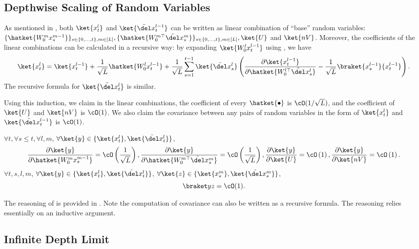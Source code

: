 \subsection{Depthwise Scaling of Random Variables}

As mentioned in , both $\ket{x_t^l}$ and $\ket{\tilde\del x_t^{l-1}}$ can be written as linear combination of ``base'' random variables: $\{\hatket{W_0^m x_s^{m-1}}\}_{s\in \{0,\ldots, t\}, m\in [L]},\{\hatket{W_0^{m\top} \tilde\del x_s^{m}}\}_{s\in \{0,\ldots, t\}, m\in [L]}, \ket{U}$ and $\ket{nV}$. Moreover, the coefficients of the linear combinations can be calculated in a recursive way: 
by expanding $\ket{W_0^l x_t^{l-1}}$ using , we have 
\[\ket{x_t^l} = \ket{x_t^{l-1}} + \frac1{\sqrt L} \hatket{W_0^l x_t^{l-1}} + \frac1{\sqrt L} \sum_{s=1}^{t-1} \ket{\tilde\del x_s^{l}} \left(\frac{\partial \ket{x_t^{l-1}}}{\partial \hatket{W_0^{l\top} \tilde\del x_s^{l}}} - \frac1{\sqrt L} \braket{x_s^{l-1}}{x_t^{l-1}} \right).\]
The recursive formula for $\ket{\tilde\del x_t^l}$ is similar. 

Using this induction, we claim in the linear combinations, the coefficient of every $\hatket{\bullet}$ is $\cO(1/\sqrt{L})$, and the coefficient of $\ket{U}$ and $\ket{nV}$ is $\cO(1)$. We also claim the covariance between any pairs of random variables in the form of $\ket{x_t^l}$ and $\ket{\tilde\del x_t^{l-1}}$ is $\cO(1)$. 
\begin{prop}\label{prop:derivatives}
     $\forall t, \forall s \leq t, \forall l,m$, $\forall \ket{y}\in \{\ket{x_t^l}, \ket{\tilde\del x_t^l}\}$, 
     \[\frac{\partial \ket{y}}{\partial \hatket{W_0^mx_s^{m-1}}} = \cO\left(\frac1{\sqrt L}\right),
     \frac{\partial \ket{y}}{\partial \hatket{W_0^{m\top}\tilde\del x_s^m}} = \cO\left(\frac1{\sqrt L}\right),
     \frac{\partial \ket{y}}{\partial \ket{U}} = \cO\left(1\right),
     \frac{\partial \ket{y}}{\partial \ket{nV}} = \cO\left(1\right).\]
     $\forall t, s,l,m$, $\forall \ket{y}\in \{\ket{x_t^l}, \ket{\tilde\del x_t^l}\}$, $\forall \ket{z}\in \{\ket{x_s^m}, \ket{\tilde\del x_s^m}\}$,
     \[\braket y z=\cO(1).\]
\end{prop}

The reasoning of  is provided in . Note the computation of covariance can also be written as a recursive formula. The reasoning relies essentially on an inductive argument. 

\subsection{Infinite Depth Limit}

